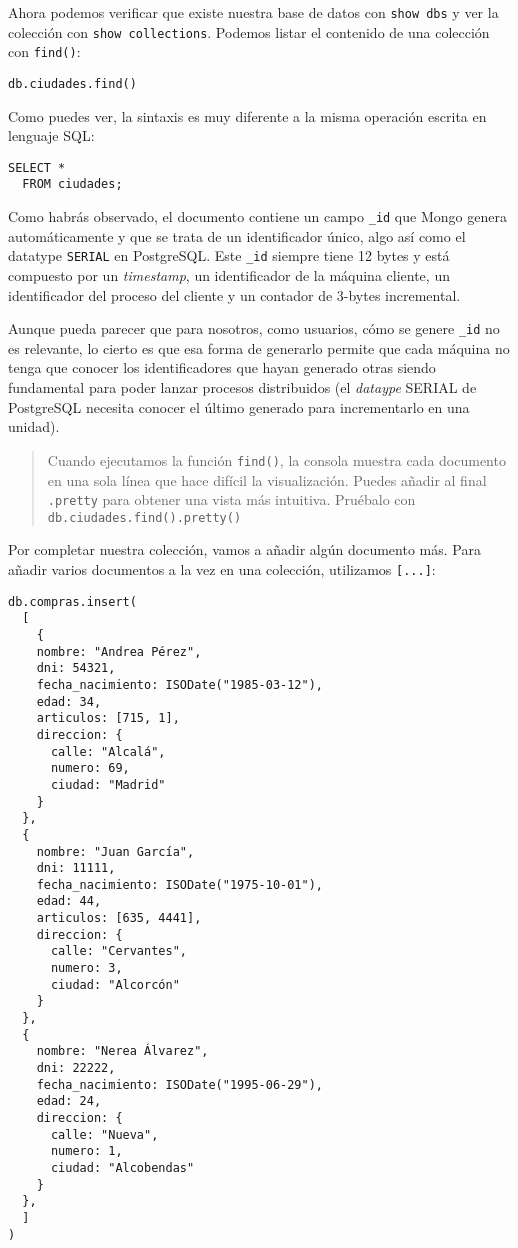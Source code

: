 \documentclass[]{article}
\begin{document}
Ahora podemos verificar que existe nuestra base de datos con
\texttt{show\ dbs} y ver la colección con \texttt{show\ collections}.
Podemos listar el contenido de una colección con \texttt{find()}:

\begin{verbatim}
db.ciudades.find()
\end{verbatim}

Como puedes ver, la sintaxis es muy diferente a la misma operación
escrita en lenguaje SQL:

\begin{verbatim}
SELECT * 
  FROM ciudades;
\end{verbatim}

Como habrás observado, el documento contiene un campo \texttt{\_id} que
Mongo genera automáticamente y que se trata de un identificador único,
algo así como el datatype \texttt{SERIAL} en PostgreSQL. Este
\texttt{\_id} siempre tiene 12 bytes y está compuesto por un
\emph{timestamp}, un identificador de la máquina cliente, un
identificador del proceso del cliente y un contador de 3-bytes
incremental.

Aunque pueda parecer que para nosotros, como usuarios, cómo se genere
\texttt{\_id} no es relevante, lo cierto es que esa forma de generarlo
permite que cada máquina no tenga que conocer los identificadores que
hayan generado otras siendo fundamental para poder lanzar procesos
distribuidos (el \emph{dataype} SERIAL de PostgreSQL necesita conocer el
último generado para incrementarlo en una unidad).

\begin{quote}
Cuando ejecutamos la función \texttt{find()}, la consola muestra cada
documento en una sola línea que hace difícil la visualización. Puedes
añadir al final \texttt{.pretty} para obtener una vista más intuitiva.
Pruébalo con \texttt{db.ciudades.find().pretty()}
\end{quote}

Por completar nuestra colección, vamos a añadir algún documento más.
Para añadir varios documentos a la vez en una colección, utilizamos
\texttt{{[}...{]}}:

\begin{verbatim}
db.compras.insert(
  [
    {
    nombre: "Andrea Pérez",
    dni: 54321,
    fecha_nacimiento: ISODate("1985-03-12"),
    edad: 34,
    articulos: [715, 1],
    direccion: {
      calle: "Alcalá",
      numero: 69,
      ciudad: "Madrid"
    }
  },
  {
    nombre: "Juan García",
    dni: 11111,
    fecha_nacimiento: ISODate("1975-10-01"),
    edad: 44,
    articulos: [635, 4441],
    direccion: {
      calle: "Cervantes",
      numero: 3,
      ciudad: "Alcorcón"
    }
  },
  {
    nombre: "Nerea Álvarez",
    dni: 22222,
    fecha_nacimiento: ISODate("1995-06-29"),
    edad: 24,
    direccion: {
      calle: "Nueva",
      numero: 1,
      ciudad: "Alcobendas"
    }
  },
  ]
)
\end{verbatim}
\end{document}
